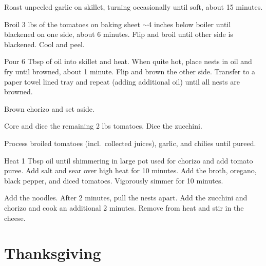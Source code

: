 \documentclass[oneside]{book}  %
\def\thisrecipe{}  %
\newcommand{\recipe}[1]{\section{#1}\def\thisrecipe{: #1}} %
\newcommand{\about}{$\sim$}
\begin{document}
\begin{directions}
  \item Roast unpeeled garlic on skillet, turning occasionally until soft, about
    15 minutes.

  \item Broil 3 lbs of the tomatoes on baking sheet \about 4 inches below boiler
    until blackened on one side, about 6 minutes. Flip and broil until other
    side is blackened. Cool and peel.

  \item Pour 6 Tbsp of oil into skillet and heat. When quite hot, place nests in
    oil and fry until browned, about 1 minute. Flip and brown the other side.
    Transfer to a paper towel lined tray and repeat (adding additional oil)
    until all nests are browned.

  \item Brown chorizo and set aside.

  \item Core and dice the remaining 2 lbs tomatoes. Dice the zucchini.

  \item Process broiled tomatoes (incl.\ collected juices), garlic, and chilies
    until pureed.

  \item Heat 1 Tbsp oil until shimmering in large pot used for chorizo and add
    tomato puree. Add salt and sear over high heat for 10 minutes. Add the
    broth, oregano, black pepper, and diced tomatoes. Vigorously simmer for 10
    minutes.

  \item Add the noodles. After 2 minutes, pull the nests apart. Add the zucchini
    and chorizo and cook an additional 2 minutes. Remove from heat and stir in
    the cheese.
\end{directions}
\recipe{Thanksgiving} \label{recipe:thanksgiving} %
\end{document}
